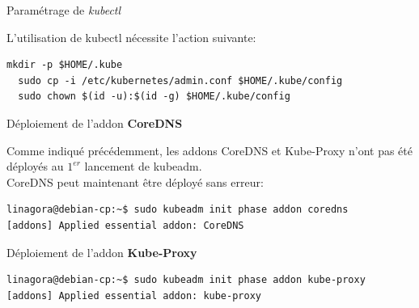 
\begin{frame}[fragile]{Paramétrage de \textit{kubectl}}

   L'utilisation de kubectl nécessite l'action suivante:

\begin{tiny}
\begin{Verbatim}[commandchars=\&\@\@]
  mkdir -p $HOME/.kube
  sudo cp -i /etc/kubernetes/admin.conf $HOME/.kube/config
  sudo chown $(id -u):$(id -g) $HOME/.kube/config
\end{Verbatim}
\end{tiny}

\end{frame}


\begin{frame}[fragile]{Déploiement de l'addon \textbf{CoreDNS}}

   Comme indiqué précédemment, les addons CoreDNS et Kube-Proxy n'ont pas été déployés au $1^{er}$ lancement de kubeadm.\\
   CoreDNS peut maintenant être déployé sans erreur:\\

\begin{tiny}
\begin{Verbatim}[commandchars=\\\{\}]
linagora@debian-cp:~$ sudo kubeadm init phase addon coredns
[addons] Applied essential addon: CoreDNS
\end{Verbatim}
\end{tiny}

\end{frame}


\begin{frame}[fragile]{Déploiement de l'addon \textbf{Kube-Proxy}}

\begin{tiny}
\begin{Verbatim}[commandchars=\\\{\}]
linagora@debian-cp:~$ sudo kubeadm init phase addon kube-proxy
[addons] Applied essential addon: kube-proxy
\end{Verbatim}
\end{tiny}

\end{frame}

